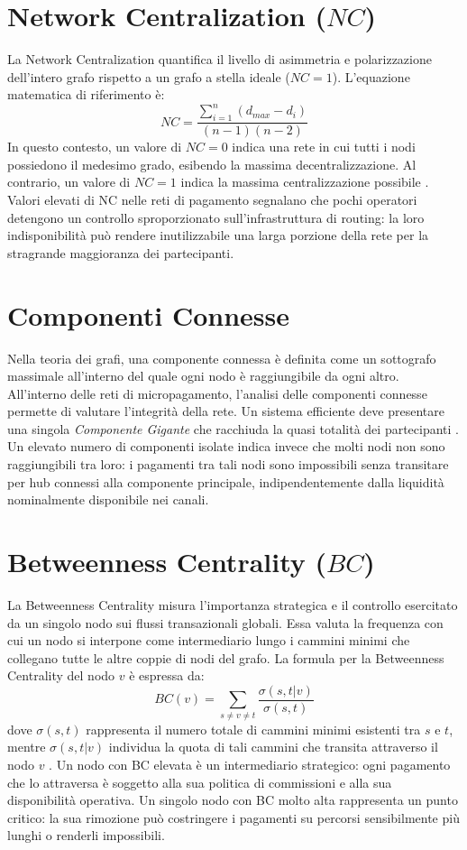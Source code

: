 \documentclass[12pt,a4paper,oneside]{book}
\begin{document}
\section{Network Centralization ($NC$)}
La Network Centralization quantifica il livello di asimmetria e polarizzazione dell'intero grafo rispetto a un grafo a stella ideale ($NC=1$). L'equazione matematica di riferimento è:
\begin{equation}
    NC = \frac{\sum_{i=1}^{n} (d_{max} - d_i)}{(n-1)(n-2)}
\end{equation}
In questo contesto, un valore di $NC = 0$ indica una rete in cui tutti i nodi possiedono il medesimo grado, esibendo la massima decentralizzazione. Al contrario, un valore di $NC = 1$ indica la massima centralizzazione possibile \cite{MagnaniMarzolla2026}. Valori elevati di NC nelle reti di pagamento segnalano che pochi operatori detengono un controllo sproporzionato sull'infrastruttura di routing: la loro indisponibilità può rendere inutilizzabile una larga porzione della rete per la stragrande maggioranza dei partecipanti.

\section{Componenti Connesse}
Nella teoria dei grafi, una componente connessa è definita come un sottografo massimale all'interno del quale ogni nodo è raggiungibile da ogni altro. All'interno delle reti di micropagamento, l'analisi delle componenti connesse permette di valutare l'integrità della rete. Un sistema efficiente deve presentare una singola \textit{Componente Gigante} che racchiuda la quasi totalità dei partecipanti \cite{MagnaniMarzolla2026}. Un elevato numero di componenti isolate indica invece che molti nodi non sono raggiungibili tra loro: i pagamenti tra tali nodi sono impossibili senza transitare per hub connessi alla componente principale, indipendentemente dalla liquidità nominalmente disponibile nei canali.

\section{Betweenness Centrality ($BC$)}
La Betweenness Centrality misura l'importanza strategica e il controllo esercitato da un singolo nodo sui flussi transazionali globali. Essa valuta la frequenza con cui un nodo si interpone come intermediario lungo i cammini minimi che collegano tutte le altre coppie di nodi del grafo. La formula per la Betweenness Centrality del nodo $v$ è espressa da:
\begin{equation}
    BC(v) = \sum_{s \neq v \neq t} \frac{\sigma(s,t|v)}{\sigma(s,t)}
\end{equation}
dove $\sigma(s,t)$ rappresenta il numero totale di cammini minimi esistenti tra $s$ e $t$, mentre $\sigma(s,t|v)$ individua la quota di tali cammini che transita attraverso il nodo $v$ \cite{MagnaniMarzolla2026}. Un nodo con BC elevata è un intermediario strategico: ogni pagamento che lo attraversa è soggetto alla sua politica di commissioni e alla sua disponibilità operativa. Un singolo nodo con BC molto alta rappresenta un punto critico: la sua rimozione può costringere i pagamenti su percorsi sensibilmente più lunghi o renderli impossibili.
\end{document}
